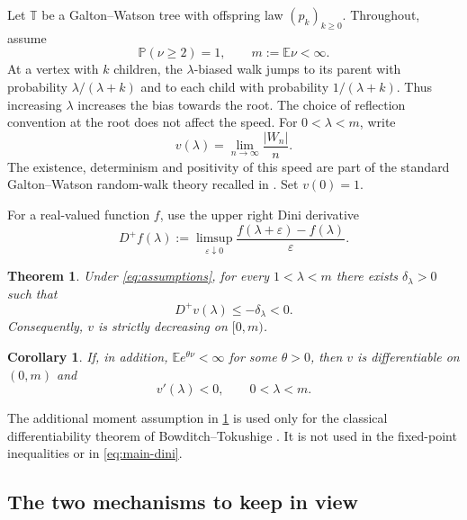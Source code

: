 \documentclass[11pt,a4paper]{article}
\numberwithin{equation}{section}
\theoremstyle{notethm}
\newtheorem{theorem}{Theorem}[section]
\newtheorem{corollary}[corollary]{Corollary}
\theoremstyle{definition}
\newcommand{\E}{\mathbb E}
\newcommand{\PP}{\mathbb P}
\newcommand{\Dplus}{D^{+}}
\begin{document}
Let $\mathbb T$ be a Galton--Watson tree with offspring law $(p_k)_{k\ge0}$.
Throughout, assume
\begin{equation}\label{eq:assumptions}
 \PP(\nu\ge2)=1,\qquad m:=\E\nu<\infty.
\end{equation}
At a vertex with $k$ children, the $\lambda$-biased walk jumps to its parent
with probability $\lambda/(\lambda+k)$ and to each child with probability
$1/(\lambda+k)$. Thus increasing $\lambda$ increases the bias towards the root.
The choice of reflection convention at the root does not affect the speed.
For $0<\lambda<m$, write
\begin{equation}\label{eq:speed-def}
 v(\lambda)=\lim_{n\to\infty}\frac{|W_n|}{n}.
\end{equation}
The existence, determinism and positivity of this speed are part of the
standard Galton--Watson random-walk theory recalled in
\cite[Section~1]{Aidekon}. Set $v(0)=1$.

For a real-valued function $f$, use the upper right Dini derivative
\begin{equation}\label{eq:dini-def}
 \Dplus f(\lambda)
 :=\limsup_{\varepsilon\downarrow0}
       \frac{f(\lambda+\varepsilon)-f(\lambda)}{\varepsilon}.
\end{equation}

\begin{theorem}\label{thm:main}
Under \eqref{eq:assumptions}, for every $1<\lambda<m$ there exists
$\delta_\lambda>0$ such that
\begin{equation}\label{eq:main-dini}
 \Dplus v(\lambda)\le-\delta_\lambda<0.
\end{equation}
Consequently, $v$ is strictly decreasing on $[0,m)$.
\end{theorem}

\begin{corollary}\label{cor:derivative}
If, in addition, $\E e^{\theta\nu}<\infty$ for some $\theta>0$, then
$v$ is differentiable on $(0,m)$ and
\begin{equation}\label{eq:negative-derivative}
 v'(\lambda)<0,\qquad 0<\lambda<m.
\end{equation}
\end{corollary}

The additional moment assumption in \cref{cor:derivative} is used only for the
classical differentiability theorem of Bowditch--Tokushige
\cite[Theorem~1.1]{BT}. It is not used in the fixed-point inequalities or in
\eqref{eq:main-dini}.

\subsection*{The two mechanisms to keep in view}
\end{document}
